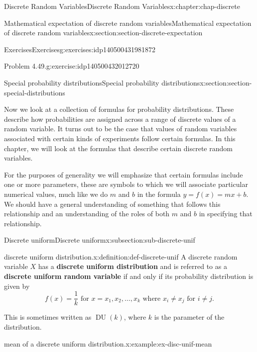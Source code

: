 \documentclass[oneside,10pt,]{book}
\newcommand{\terminology}[1]{\textbf{#1}}
\begin{document}
\begin{chapterptx}{Discrete Random Variables}{}{Discrete Random Variables}{}{}{x:chapter:chap-discrete}
\begin{sectionptx}{Mathematical expectation of discrete random variables}{}{Mathematical expectation of discrete random variables}{}{}{x:section:section-discrete-expectation}
\begin{exercises-subsection}{Exercises}{}{Exercises}{}{}{g:exercises:idp140500431981872}
\begin{divisionexercise}{2}{Problem 4.49.}{}{g:exercise:idp140500432012720}
\end{divisionexercise}%
\end{exercises-subsection}
\end{sectionptx}
%
%
\typeout{************************************************}
\typeout{************************************************}
%
\begin{sectionptx}{Special probability distributions}{}{Special probability distributions}{}{}{x:section:section-special-distributions}
\begin{introduction}{}%
Now we look at a collection of formulas for probability distributions. These describe how probabilities are assigned across a range of discrete values of a random variable. It turns out to be the case that values of random variables associated with certain kinds of experiments follow certain formulas. In this chapter, we will look at the formulas that describe certain discrete random variables.%
\par
For the purposes of generality we will emphasize that certain formulas include one or more parameters, these are symbols to which we will associate particular numerical values, much like we do \(m\) and \(b\) in the formula \(y = f(x) = mx+b\). We should have a general understanding of something that follows this relationship and an understanding of the roles of both \(m\) and \(b\) in specifying that relationship.%
\end{introduction}%
%
%
\typeout{************************************************}
\typeout{************************************************}
%
\begin{subsectionptx}{Discrete uniform}{}{Discrete uniform}{}{}{x:subsection:sub-discrete-unif}
\begin{definition}{discrete uniform distribution.}{x:definition:def-discrete-unif}%
A discrete random variable \(\displaystyle X\) has a \terminology{discrete uniform distribution} and is referred to as a \terminology{discrete uniform random variable} if and only if its probability distribution is given by%
\begin{equation*}
f(x) = \frac{1}{k} \text{ for }
x = x_1, x_2, \dots, x_k \text{ where }x_i\ne x_j \text{ for } i \ne
j\text{.}
\end{equation*}
%
\end{definition}
This is sometimes written as \(\operatorname{DU}(k)\), where \(k\) is the parameter of the distribution.%
\begin{example}{mean of a discrete uniform distribution.}{x:example:ex-disc-unif-mean}%

\end{example}
\end{subsectionptx}
\end{sectionptx}
\end{chapterptx}
\end{document}
